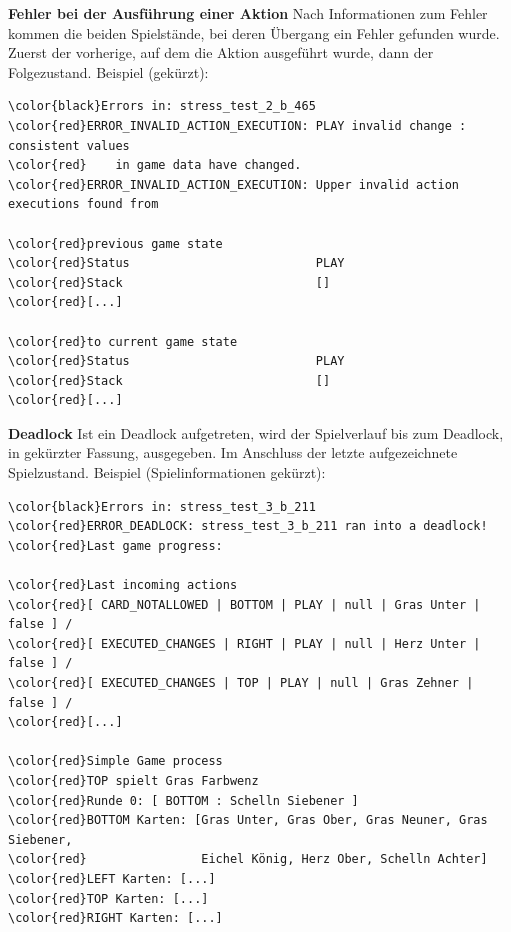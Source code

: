 \documentclass[
							a4paper, 
							11pt, 
							openany, 
							liststotoc,
							parskip=half, 
   							headings=normal
						]{scrreprt}
\begin{document}
{\textbf{Fehler bei der Ausführung einer Aktion}\newline
Nach Informationen zum Fehler kommen die beiden Spielstände, bei deren Übergang ein Fehler gefunden wurde. Zuerst der vorherige, auf dem die Aktion ausgeführt wurde, dann der Folgezustand.\newline
Beispiel (gekürzt):
\small
\begin{Verbatim}[commandchars=\\\{\}]
\color{black}Errors in: stress_test_2_b_465
\color{red}ERROR_INVALID_ACTION_EXECUTION: PLAY invalid change : consistent values 
\color{red}    in game data have changed.
\color{red}ERROR_INVALID_ACTION_EXECUTION: Upper invalid action executions found from 

\color{red}previous game state 
\color{red}Status                          PLAY                            
\color{red}Stack                           []
\color{red}[...]

\color{red}to current game state
\color{red}Status                          PLAY                            
\color{red}Stack                           []
\color{red}[...]
\end{Verbatim}
\normalsize
\bigskip

\textbf{Deadlock}\newline
Ist ein Deadlock aufgetreten, wird der Spielverlauf bis zum Deadlock, in gekürzter Fassung, ausgegeben. Im Anschluss der letzte aufgezeichnete Spielzustand.\newline
Beispiel (Spielinformationen gekürzt):
\small
\begin{Verbatim}[commandchars=\\\{\}]
\color{black}Errors in: stress_test_3_b_211
\color{red}ERROR_DEADLOCK: stress_test_3_b_211 ran into a deadlock!
\color{red}Last game progress: 

\color{red}Last incoming actions
\color{red}[ CARD_NOTALLOWED | BOTTOM | PLAY | null | Gras Unter | false ] / 
\color{red}[ EXECUTED_CHANGES | RIGHT | PLAY | null | Herz Unter | false ] / 
\color{red}[ EXECUTED_CHANGES | TOP | PLAY | null | Gras Zehner | false ] / 
\color{red}[...]

\color{red}Simple Game process
\color{red}TOP spielt Gras Farbwenz
\color{red}Runde 0: [ BOTTOM : Schelln Siebener ]
\color{red}BOTTOM Karten: [Gras Unter, Gras Ober, Gras Neuner, Gras Siebener, 
\color{red}                Eichel König, Herz Ober, Schelln Achter]
\color{red}LEFT Karten: [...]
\color{red}TOP Karten: [...]
\color{red}RIGHT Karten: [...]


\end{Verbatim}}
\end{document}
